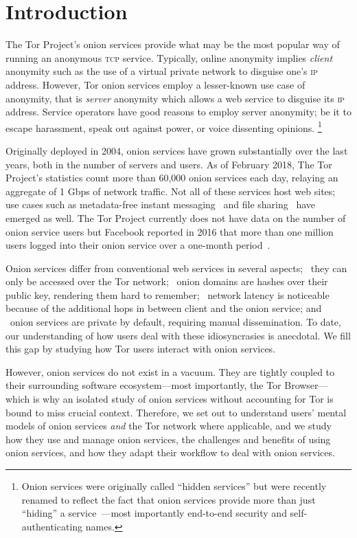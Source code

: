 \section{Introduction}
\label{sec:introduction}
The Tor Project's onion services provide what may be the most popular way of
running an anonymous \textsc{tcp} service. Typically, online anonymity implies
\emph{client} anonymity such as the use of a virtual private network to disguise
one's \textsc{ip} address.  However, Tor onion services employ a lesser-known
use case of anonymity, that is \emph{server} anonymity which allows a web
service to disguise its \textsc{ip} address.  Service operators have good
reasons to employ server anonymity; be it to escape harassment, speak out
against power, or voice dissenting opinions.  \footnote{Onion services were
originally called ``hidden services'' but were recently renamed to reflect the
fact that onion services provide more than just ``hiding'' a
service~\cite{Johnson2015a}---most importantly end-to-end security and
self-authenticating names.}

Originally deployed in 2004, onion services have grown substantially over the
last years, both in the number of servers and users.  As of February 2018, The
Tor Project's statistics count more than 60,000 onion services each day,
relaying an aggregate of 1 Gbps of network traffic.  Not all of these services
host web sites; use cases such as metadata-free instant
messaging~\cite{ricochet} and file sharing~\cite{onionshare} have emerged as
well.  The Tor Project currently does not have data on the number of onion
service users but Facebook reported in 2016 that more than one million users
logged into their onion service over a one-month period~\cite{facebook-users}.

Onion services differ from conventional web services in several aspects;
\first~they can only be accessed over the Tor network; \second~onion domains are
hashes over their public key, rendering them hard to remember; \third~network
latency is noticeable because of the additional hops in between client and the
onion service; and \fourth~onion services are private by default, requiring
manual dissemination.  To date, our understanding of how users deal with these
idiosyncrasies is anecdotal.  We fill this gap by studying how Tor users
interact with onion services.

However, onion services do not exist in a vacuum.  They are tightly coupled to
their surrounding software ecosystem---most importantly, the Tor Browser---which
is why an isolated study of onion services without accounting for Tor is bound
to miss crucial context.  Therefore, we set out to understand users' mental
models of onion services \emph{and} the Tor network where applicable, and we
study how they use and manage onion services, the challenges and benefits of
using onion services, and how they adapt their workflow to deal with onion
services.

